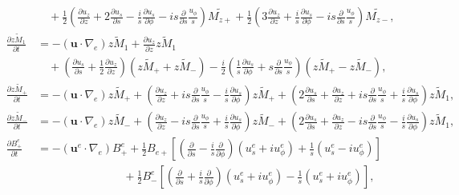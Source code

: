 \begin{align*}
    &\quad + \frac{1}{2} \left(\frac{\partial u_z}{\partial z} + 2 \frac{\partial u_s}{\partial s} - \frac{i}{s} \frac{\partial u_s}{\partial \phi} - is \frac{\partial}{\partial s}\frac{u_\phi}{s}\right) \widetilde{M_{z+}}
    + \frac{1}{2}\left(3 \frac{\partial u_z}{\partial z} + \frac{i}{s}\frac{\partial u_s}{\partial \phi} - is \frac{\partial}{\partial s}\frac{u_\phi}{s}\right) \widetilde{M_{z-}}, \\
    \frac{\partial \widetilde{zM_1}}{\partial t} &= -(\mathbf{u}\cdot \nabla_e) \widetilde{zM_1} + \frac{\partial u_z}{\partial z} \widetilde{zM_1} \\
    &\quad + \left(\frac{\partial u_s}{\partial s} + \frac{1}{2}\frac{\partial u_z}{\partial z}\right) \left(\widetilde{zM_+} + \widetilde{zM_-}\right) - \frac{i}{2}\left(\frac{1}{s}\frac{\partial u_s}{\partial \phi} + s \frac{\partial}{\partial s}\frac{u_\phi}{s}\right) \left(\widetilde{zM_+} - \widetilde{zM_-}\right), \\
    \frac{\partial \widetilde{zM_+}}{\partial t} &= - (\mathbf{u}\cdot \nabla_e) \widetilde{zM_+} + \left(\frac{\partial u_z}{\partial z} + i s\frac{\partial}{\partial s}\frac{u_\phi}{s} - \frac{i}{s}\frac{\partial u_s}{\partial \phi}\right) \widetilde{zM_+} + \left(2\frac{\partial u_s}{\partial s} + \frac{\partial u_z}{\partial z} + is \frac{\partial}{\partial s}\frac{u_\phi}{s}+ \frac{i}{s}\frac{\partial u_s}{\partial \phi}\right) \widetilde{zM_1}, \\
    \frac{\partial \widetilde{zM_-}}{\partial t} &= - (\mathbf{u}\cdot \nabla_e) \widetilde{zM_-} + \left(\frac{\partial u_z}{\partial z} - i s\frac{\partial}{\partial s}\frac{u_\phi}{s} + \frac{i}{s}\frac{\partial u_s}{\partial \phi}\right) \widetilde{zM_-} + \left(2\frac{\partial u_s}{\partial s} + \frac{\partial u_z}{\partial z} - is \frac{\partial}{\partial s}\frac{u_\phi}{s}- \frac{i}{s}\frac{\partial u_s}{\partial \phi}\right) \widetilde{zM_1}, \\
    \frac{\partial B_{+}^e}{\partial t} &= - \left(\mathbf{u}^e \cdot \nabla_e\right) B_{+}^e + \frac{1}{2} B_{e+} \left[\left(\frac{\partial}{\partial s} - \frac{i}{s}\frac{\partial}{\partial \phi}\right) \left(u_{s}^e + iu_{\phi}^e\right) + \frac{1}{s} \left(u_{s}^e - i u_{\phi}^e\right)\right] \\ 
    &\qquad \qquad \qquad \quad \,\,\,\, + \frac{1}{2} B_{-}^e \left[\left(\frac{\partial}{\partial s} + \frac{i}{s}\frac{\partial}{\partial \phi}\right) \left(u_{s}^e + iu_{\phi}^e\right) - \frac{1}{s} \left(u_{s}^e + i u_{\phi}^e\right)\right], \\ 

\end{align*}
